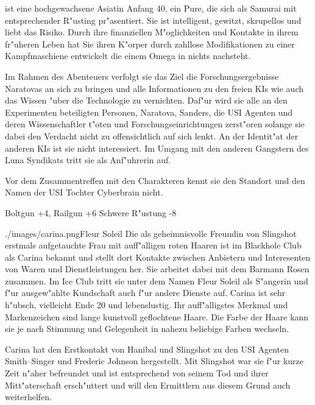 \xl{} ist eine hochgewachsene Asiatin Anfang 40, ein Pure, die sich als Samurai mit entsprechender R"usting pr"asentiert. Sie ist intelligent, gewitzt, skrupellos und liebt das Risiko. Durch ihre finanziellen M"oglichkeiten und Kontakte in ihrem fr"uheren Leben hat Sie ihren K"orper durch zahllose Modifikationen zu einer Kampfmaschiene entwickelt die einem Omega in nichts nachsteht.

Im Rahmen des Abenteuers verfolgt sie das Ziel die Forschungsergebnisse Naratovas an sich zu bringen und alle Informationen zu den freien KIs wie auch das Wissen "uber die Technologie zu vernichten. Daf"ur wird sie alle an den Experimenten beteiligten Personen, Naratova, Sanders, die USI Agenten und deren Wissenschaftler t"oten und Forschungseinrichtungen zerst"oren solange sie dabei den Verdacht nicht zu offensichtlich auf sich lenkt. An der Identit"at der anderen KIs ist sie nicht interessiert. Im Umgang mit den anderen  Gangstern des Luna Syndikats tritt sie als Anf"uhrerin auf.

Vor dem Zusammentreffen mit den Charakteren kennt sie den Standort und den Namen der USI Tochter Cyberbrain nicht.

\begin{nscsheet}[f]{\xls}
    \nscstats[ATT=9,AGG=10,EMP=4,KNO=4,HP=14]
    \nscruler
    \begin{nscinventory}
        \nscitem[Waffen] Boltgun +4, Railgun +6
        \nscitem[R"ustung] Schwere R"ustung -8
    \end{nscinventory}
\end{nscsheet}



\begin{sideimagebox}[r]{0.5}{./images/carina.png}{Fleur Soleil}
    Die als geheimnisvolle Freundin von Slingshot erstmals aufgetauchte Frau mit auff"alligen roten Haaren ist im Blackhole Club als Carina bekannt und stellt dort Kontakte zwischen Anbietern und Interesenten von Waren und Dienstleistungen her. Sie arbeitet dabei mit dem Barmann Rosen zusammen. Im Ice Club tritt sie unter dem Namen Fleur Soleil als S"angerin und f"ur ausgew"ahlte Kundschaft auch f"ur andere Dienste auf. Carina ist sehr h"ubsch, vielleicht Ende 20 und lebenslustig. Ihr auff"alligstes Merkmal und Markenzeichen sind lange kunstvoll geflochtene Haare. Die Farbe der Haare kann sie je nach Stimmung und Gelegenheit in nahezu beliebige Farben wechseln.

    Carina hat den Erstkontakt von Hanibal und Slingshot zu den USI Agenten Smith--Singer und Frederic Johnson hergestellt. Mit Slingshot war sie f"ur kurze Zeit n"aher befreundet und ist entsprechend von seinem Tod und ihrer Mitt"aterschaft ersch"uttert und will den Ermittlern aus diesem Grund auch weiterhelfen.
\end{sideimagebox}

